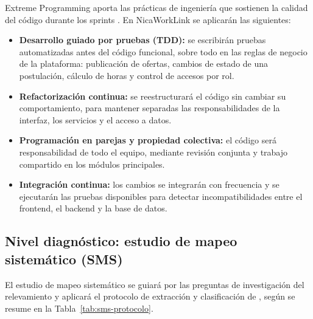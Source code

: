 Extreme Programming aporta las prácticas de ingeniería que sostienen la calidad del código durante los sprints \parencite{beck2000}. En NicaWorkLink se aplicarán las siguientes:

\begin{itemize}
	\item \textbf{Desarrollo guiado por pruebas (TDD):} se escribirán pruebas automatizadas antes del código funcional, sobre todo en las reglas de negocio de la plataforma: publicación de ofertas, cambios de estado de una postulación, cálculo de horas y control de accesos por rol.
	\item \textbf{Refactorización continua:} se reestructurará el código sin cambiar su comportamiento, para mantener separadas las responsabilidades de la interfaz, los servicios y el acceso a datos.
	\item \textbf{Programación en parejas y propiedad colectiva:} el código será responsabilidad de todo el equipo, mediante revisión conjunta y trabajo compartido en los módulos principales.
	\item \textbf{Integración continua:} los cambios se integrarán con frecuencia y se ejecutarán las pruebas disponibles para detectar incompatibilidades entre el frontend, el backend y la base de datos.
\end{itemize}

\subsection{Nivel diagnóstico: estudio de mapeo sistemático (SMS)}

El estudio de mapeo sistemático se guiará por las preguntas de investigación del relevamiento y aplicará el protocolo de extracción y clasificación de \textcite{petersen2008}, según se resume en la Tabla~\ref{tab:sms-protocolo}.

